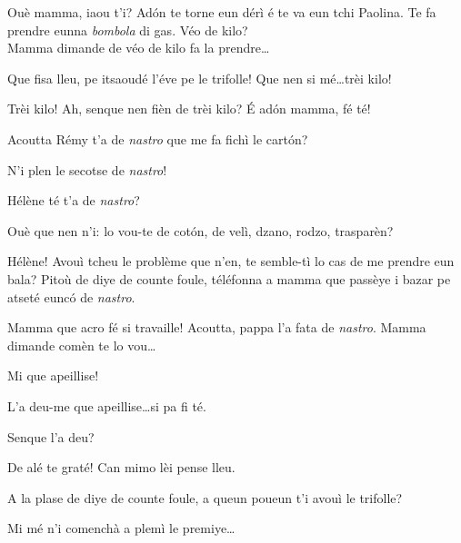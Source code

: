 \begin{drama}

\Remyspeaks Ouè mamma, iaou t'i? Ad\'on te torne eun dérì é te va eun tchi Paolina. Te fa prendre eunna \textit{bombola} di gas. Véo de kilo?\\  Mamma dimande de véo de kilo fa la prendre\ldots

\Cesarspeaks{} Que fisa lleu, pe itsaoudé l'éve pe le trifolle! Que nen si mé\ldots trèi kilo!

\Remyspeaks {} Trèi kilo! Ah, senque nen fièn de trèi kilo? É ad\'on mamma, fé té!


\Cesarspeaks{}	Acoutta Rémy t'a de \textit{nastro} que me fa fichì le cart\'on?

\Remyspeaks{} N'i plen le secotse de \textit{nastro}! 

\Cesarspeaks {} Hélène té t'a de \textit{nastro}?

\Helenespeaks  {} Ouè que nen n'i: lo vou-te de cot\'on, de velì, dzano, rodzo, trasparèn?

\Cesarspeaks{} Hélène! Avouì tcheu le problème que n'en, te sem\-ble-tì lo cas de me prendre eun bala? Pitoù de diye de counte foule,  téléfonna a mamma que passèye i bazar pe a\-tseté eunc\'o de \textit{nastro}.


\Helenespeaks Mamma que acro fé si travaille! Acoutta, pappa l'a fata de \textit{nastro}.  Mamma dimande comèn te lo vou\ldots

\Cesarspeaks{} Mi que apeillise!

\Helenespeaks {} L'a deu-me que apeillise\ldots si pa fi té.


\Cesarspeaks Senque l'a deu?

\Helenespeaks{} De alé te graté! Can mimo lèi pense lleu.

\Cesarspeaks A la plase de diye de counte foule, a queun poueun t'i avouì le trifolle?

\Helenespeaks  Mi mé n'i comenchà a plemì le premiye\ldots 


\end{drama}
